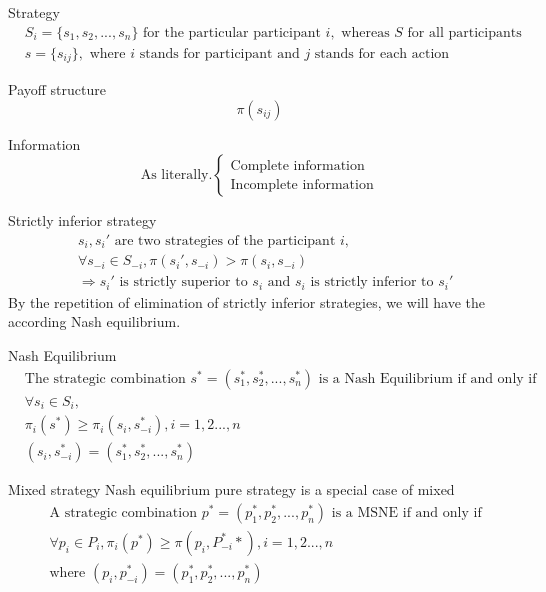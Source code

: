 \documentclass{article}
\begin{document}
Strategy
\begin{align}
&S_{i}=\{s_{1},s_{2},...,s_{n}\} \text{ for the particular participant } i,\text{ whereas }S \text{ for all participants}
\\&s=\{s_{ij}\},\text{ where } i \text{ stands for participant and }j \text{ stands for each action}
\end{align}

Payoff structure
$$\pi(s_{ij})$$

Information
$$\text{As literally.} \begin{cases}\text{Complete information} \\
\text{Incomplete information}
\end{cases}$$

Strictly inferior strategy
\begin{align}
&s_{i}, s_{i}' \text{ are two strategies of the participant }i,
\\&\forall s_{-i}\in S_{-i}, \pi(s_{i}',s_{-i})>\pi(s_{i},s_{-i})
\\&\Rightarrow s_{i}' \text{ is strictly superior to }s_{i} \text{ and }s_{i} \text{ is strictly inferior to }s_{i}'
\end{align}
By the repetition of elimination of strictly inferior strategies, we will have the according Nash equilibrium.

Nash Equilibrium
\begin{align}
&\text{The strategic combination }s^{*}=(s_{1}^{*},s_{2}^{*},...,s_{n}^{*}) \text{ is a Nash Equilibrium if and only if}
\\& \forall s_{i}\in S_{i},
\\&\pi_{i}(s^{*})\geqslant \pi_{i}(s_{i},s_{-i}^{*}),i=1,2...,n
\\&(s_{i},s_{-i}^{*})=(s_{1}^{*},s_{2}^{*},...,s_{n}^{*}) 
\end{align}

Mixed strategy Nash equilibrium
pure strategy is a special case of mixed
\begin{align}
&\text{A strategic combination }p^{*}=(p_{1}^{*},p_{2}^{*},...,p_{n}^{*}) \text{ is a MSNE if and only if}
\\&\forall p_{i}\in P_{i},\pi_{i}(p^{*})\geqslant \pi(p_{i},P_{-i}^**),i=1,2...,n
\\&\text{where } (p_{i},p_{-i}^{*})=(p_{1}^{*},p_{2}^{*},...,p_{n}^{*})
\end{align}
\end{document}
